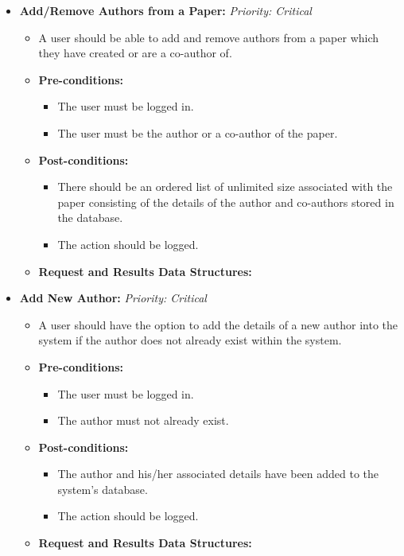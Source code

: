\documentclass{article}
\begin{document}
\begin{itemize}
					\item \textbf{Add/Remove Authors from a Paper:} \hfill \textit{Priority: Critical}
					\begin{itemize}
						\item A user should be able to add and remove authors from a paper which they have created or are a co-author of.
						\item \textbf{Pre-conditions:}
						\begin{itemize}
							\item The user must be logged in.
							\item The user must be the author or a co-author of the paper.
						\end{itemize}
						\item \textbf{Post-conditions:}
						\begin{itemize}
							\item There should be an ordered list of unlimited size associated with the paper consisting of the details of the author and co-authors stored in the database.
							\item The action should be logged.
						\end{itemize}
						\item \textbf{Request and Results Data Structures:}
					\end{itemize}
					
					\item \textbf{Add New Author:} \hfill \textit{Priority: Critical}
					\begin{itemize}
						\item A user should have the option to add the details of a new author into the system if the author does not already exist within the system.
						\item \textbf{Pre-conditions:}
						\begin{itemize}
							\item The user must be logged in.
							\item The author must not already exist. 
						\end{itemize}
						\item \textbf{Post-conditions:}
						\begin{itemize}
							\item The author and his/her associated details have been added to the system's database.
							\item The action should be logged.
						\end{itemize}
						\item \textbf{Request and Results Data Structures:}
					\end{itemize}					
					

\end{itemize}
\end{document}
